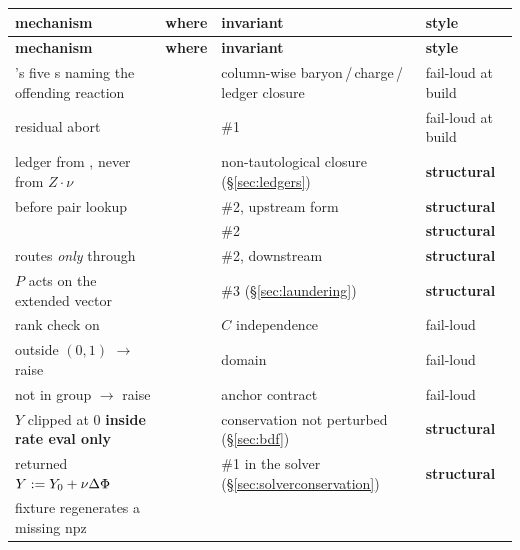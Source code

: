 \begingroup
\small
\begin{longtable}{@{}L{4.9cm} L{3.9cm} L{3.9cm} L{2.1cm}@{}}
\toprule
\textbf{mechanism} & \textbf{where} & \textbf{invariant} & \textbf{style} \\
\midrule
\endfirsthead
\toprule
\textbf{mechanism} & \textbf{where} & \textbf{invariant} & \textbf{style} \\
\midrule
\endhead
\bottomrule
\endfoot
{}'s five s naming the offending
  reaction &  &
  column-wise baryon\,/\,charge\,/\,ledger closure & fail-loud at build \\
 residual  abort &  &
  \#1 & fail-loud at build \\
ledger from , never from $Z\cdot\nu$ &
   & non-tautological closure (\S\ref{sec:ledgers}) &
  \textbf{structural} \\
 before pair lookup &
   & \#2, upstream form &
  \textbf{structural} \\
 &
   & \#2 & \textbf{structural} \\
 routes \emph{only} through  &
   & \#2, downstream & \textbf{structural} \\
$P$ acts on the extended vector &  &
  \#3 (\S\ref{sec:laundering}) & \textbf{structural} \\
rank check on  &
   & $C$ independence &
  fail-loud \\
 outside $(0, 1)$ $\to$ raise &  &
  domain & fail-loud \\
 not in group $\to$ raise &
   & anchor contract &
  fail-loud \\
$Y$ clipped at 0 \textbf{inside rate eval only} &
   &
  conservation not perturbed (\S\ref{sec:bdf}) & \textbf{structural} \\
returned $Y := Y_0 + \nu\Delta\Phi$ &  &
  \#1 in the solver (\S\ref{sec:solverconservation}) & \textbf{structural} \\
 fixture regenerates a missing npz &

\end{longtable}
